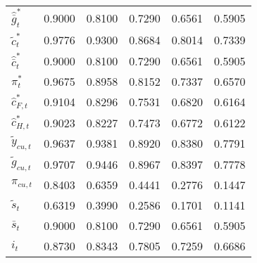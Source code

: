 \begin{center}
\begin{longtable}{lccccc}
${\hat {\bar g}_t^*}  $	 & 	    0.9000	 & 	    0.8100	 & 	    0.7290	 & 	    0.6561	 & 	    0.5905 \\ 
${\tilde c_t^*}       $	 & 	    0.9776	 & 	    0.9300	 & 	    0.8684	 & 	    0.8014	 & 	    0.7339 \\ 
${\hat {\bar c}_t^*}  $	 & 	    0.9000	 & 	    0.8100	 & 	    0.7290	 & 	    0.6561	 & 	    0.5905 \\ 
${\pi_t^*}            $	 & 	    0.9675	 & 	    0.8958	 & 	    0.8152	 & 	    0.7337	 & 	    0.6570 \\ 
${\hat c_{F,t}^*}     $	 & 	    0.9104	 & 	    0.8296	 & 	    0.7531	 & 	    0.6820	 & 	    0.6164 \\ 
${\hat c_{H,t}^*}     $	 & 	    0.9023	 & 	    0.8227	 & 	    0.7473	 & 	    0.6772	 & 	    0.6122 \\ 
${\tilde y_{cu,t}}    $	 & 	    0.9637	 & 	    0.9381	 & 	    0.8920	 & 	    0.8380	 & 	    0.7791 \\ 
${\tilde g_{cu,t}}    $	 & 	    0.9707	 & 	    0.9446	 & 	    0.8967	 & 	    0.8397	 & 	    0.7778 \\ 
${\pi_{cu,t}}         $	 & 	    0.8403	 & 	    0.6359	 & 	    0.4441	 & 	    0.2776	 & 	    0.1447 \\ 
${\tilde s_t}         $	 & 	    0.6319	 & 	    0.3990	 & 	    0.2586	 & 	    0.1701	 & 	    0.1141 \\ 
${\bar s_t}           $	 & 	    0.9000	 & 	    0.8100	 & 	    0.7290	 & 	    0.6561	 & 	    0.5905 \\ 
${i_t}                $	 & 	    0.8730	 & 	    0.8343	 & 	    0.7805	 & 	    0.7259	 & 	    0.6686 \\ 
\end{longtable}
 \end{center}

